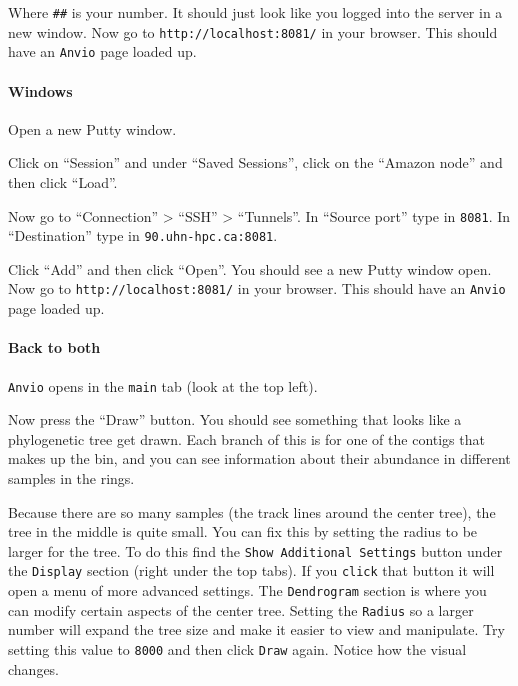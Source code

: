 \documentclass[
]{book}
\begin{document}
Where \texttt{\#\#} is your number. It should just look like you logged into the server in a new window. Now go to \texttt{http://localhost:8081/} in your browser. This should have an \texttt{Anvi\textquotesingle{}o} page loaded up.

\paragraph{Windows}\label{windows}

Open a new Putty window.

Click on ``Session'' and under ``Saved Sessions'', click on the ``Amazon node'' and then click ``Load''.

Now go to ``Connection'' \textgreater{} ``SSH'' \textgreater{} ``Tunnels''. In ``Source port'' type in \texttt{8081}. In ``Destination'' type in \texttt{90.uhn-hpc.ca:8081}.

Click ``Add'' and then click ``Open''. You should see a new Putty window open. Now go to \texttt{http://localhost:8081/} in your browser. This should have an \texttt{Anvi\textquotesingle{}o} page loaded up.

\paragraph{Back to both}\label{back-to-both}

\texttt{Anvi\textquotesingle{}o} opens in the \texttt{main} tab (look at the top left).

Now press the ``Draw'' button. You should see something that looks like a phylogenetic tree get drawn. Each branch of this is for one of the contigs that makes up the bin, and you can see information about their abundance in different samples in the rings.

Because there are so many samples (the track lines around the center tree), the tree in the middle is quite small. You can fix this by setting the radius to be larger for the tree. To do this find the \texttt{Show\ Additional\ Settings} button under the \texttt{Display} section (right under the top tabs). If you \texttt{click} that button it will open a menu of more advanced settings. The \texttt{Dendrogram} section is where you can modify certain aspects of the center tree. Setting the \texttt{Radius} so a larger number will expand the tree size and make it easier to view and manipulate. Try setting this value to \texttt{8000} and then click \texttt{Draw} again. Notice how the visual changes.
\end{document}
